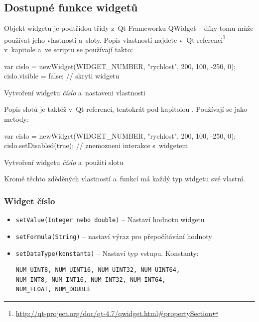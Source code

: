 \documentclass[12pt, a4paper, oneside]{article}
\newcommand{\It}{\textit}  %
\begin{document}
\subsection*{Dostupné funkce widgetů}
Objekt widgetu je podtřídou třídy z~Qt Frameworku QWidget -- díky tomu může používat jeho vlastnosti a~sloty. Popis vlastností najdete v~Qt referenci\footnote{\url{http://qt-project.org/doc/qt-4.7/qwidget.html\#propertySection}} v~kapitole  a~ve scriptu se používají takto:

\begin{listing}[H]
\begin{jscode}
var cislo = newWidget(WIDGET_NUMBER,
                "rychlost", 200, 100, -250, 0);
cislo.visible = false; // skryti widgetu
\end{jscode}
\caption{Vytvoření widgetu \It{číslo} a~nastaveni vlastnosti }
\end{listing}
Popis slotů je taktéž v~Qt referenci, tentokrát pod kapitolou . Používají se jako metody:

\begin{listing}[H]
\begin{jscode}
var cislo = newWidget(WIDGET_NUMBER,
                "rychlost", 200, 100, -250, 0);
cislo.setDisabled(true); // znemozneni interakce s~widgetem
\end{jscode}
\caption{Vytvoření widgetu \It{číslo} a~použití slotu}
\end{listing}

Kromě těchto zděděných vlastností a~funkcí má každý typ widgetu své vlastní.

\subsubsection*{Widget číslo}
\begin{itemize}
    \item {\color{blue}\verb/setValue(Integer nebo double)/} -- Nastaví hodnotu widgetu
    \item {\color{blue}\verb/setFormula(String)/} -- nastaví výraz pro přepočítávání hodnoty
    \item {\color{blue}\verb/setDataType(konstanta)/} -- Nastaví typ vstupu. Konstanty:
        \begin{verbatim}
NUM_UINT8, NUM_UINT16, NUM_UINT32, NUM_UINT64, 
NUM_INT8, NUM_INT16, NUM_INT32, NUM_INT64, 
NUM_FLOAT, NUM_DOUBLE
        \end{verbatim}
\end{itemize}
\end{document}
